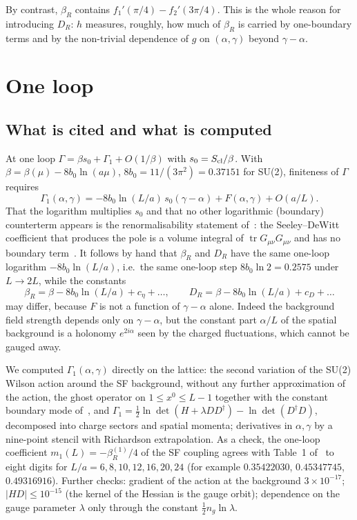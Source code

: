 \documentclass[11pt,a4paper]{article}
\theoremstyle{definition}
\theoremstyle{remark}
\newcommand{\bR}{\beta_R}
\newcommand{\DR}{D_R}
\begin{document}
By contrast, $\bR$ contains $f_1'(\pi/4)-f_2'(3\pi/4)$. This is the whole reason for introducing $\DR$: $h$ measures, roughly, how much of $\bR$ is carried by one-boundary terms and by the non-trivial dependence of $g$ on $(\alpha,\gamma)$ beyond $\gamma-\alpha$.

\section{One loop}\label{sec:oneloop}

\subsection{What is cited and what is computed}

At one loop $\Gamma=\beta s_0+\Gamma_1+O(1/\beta)$ with $s_0=S_{\rm cl}/\beta$. With $\beta=\beta(\mu)-8b_0\ln(a\mu)$, $8b_0=11/(3\pi^2)=0.37151$ for SU(2), finiteness of $\Gamma$ requires
\[
\Gamma_1(\alpha,\gamma)=-8b_0\ln(L/a)\,s_0(\gamma-\alpha)+F(\alpha,\gamma)+O(a/L).
\]
That the logarithm multiplies $s_0$ and that no other logarithmic (boundary) counterterm appears is the renormalisability statement of~\cite{LNWW}: the Seeley--DeWitt coefficient that produces the pole is a volume integral of $\operatorname{tr}G_{\mu\nu}G_{\mu\nu}$ and has no boundary term~\cite[(3.28), (3.36)]{LNWW}. It follows by hand that $\bR$ and $\DR$ have the same one-loop logarithm $-8b_0\ln(L/a)$, i.e.\ the same one-loop step $8b_0\ln2=0.2575$ under $L\to2L$, while the constants
\[
\bR=\beta-8b_0\ln(L/a)+c_\eta+\dots,\qquad \DR=\beta-8b_0\ln(L/a)+c_D+\dots
\]
may differ, because $F$ is not a function of $\gamma-\alpha$ alone. Indeed the background field strength depends only on $\gamma-\alpha$, but the constant part $\alpha/L$ of the spatial background is a holonomy $e^{2i\alpha}$ seen by the charged fluctuations, which cannot be gauged away.

We computed $\Gamma_1(\alpha,\gamma)$ directly on the lattice: the second variation of the SU(2) Wilson action around the SF background, without any further approximation of the action, the ghost operator on $1\le x^0\le L-1$ together with the constant boundary mode of~\cite[(6.3)]{LNWW}, and $\Gamma_1=\tfrac12\ln\det(H+\lambda DD^\dagger)-\ln\det(D^\dagger D)$, decomposed into charge sectors and spatial momenta; derivatives in $\alpha,\gamma$ by a nine-point stencil with Richardson extrapolation. As a check, the one-loop coefficient $m_1(L)=-\bR^{(1)}/4$ of the SF coupling agrees with Table~1 of~\cite{LNWW} to eight digits for $L/a=6,8,10,12,16,20,24$ (for example $0.35422030$, $0.45347745$, $0.49316916$). Further checks: gradient of the action at the background $3\times10^{-17}$; $|HD|\le10^{-15}$ (the kernel of the Hessian is the gauge orbit); dependence on the gauge parameter $\lambda$ only through the constant $\tfrac12 n_g\ln\lambda$.
\end{document}
